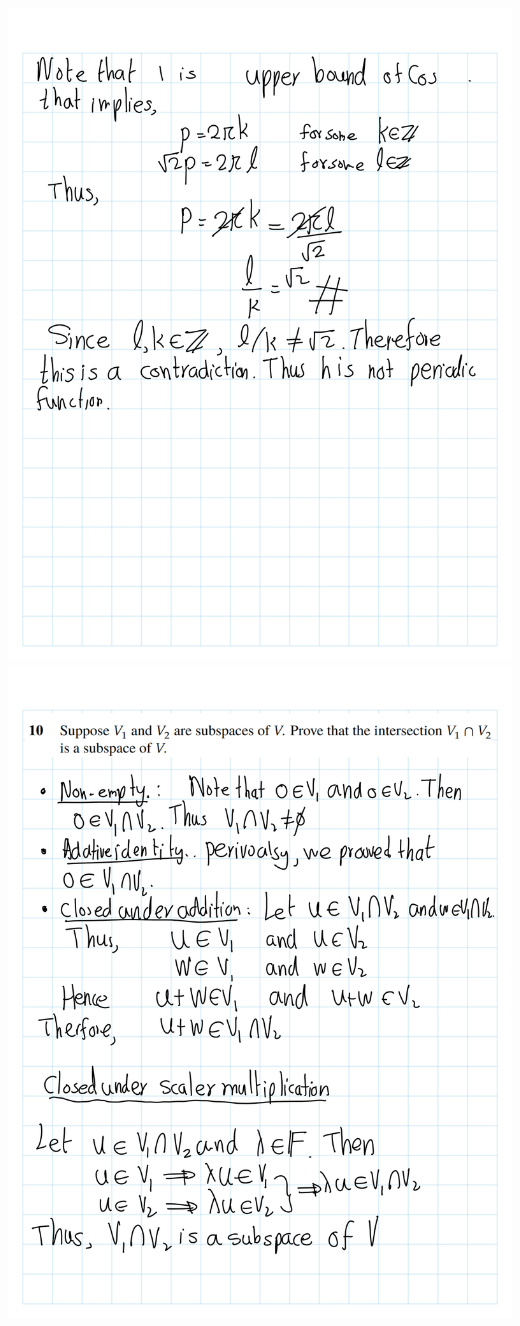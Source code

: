 \documentclass[
]{book}
\theoremstyle{definition}
\theoremstyle{definition}
\theoremstyle{definition}
\theoremstyle{definition}
\theoremstyle{remark}
\begin{document}
\begin{enumerate}
  \includegraphics{fig/Ex1C/Ex/Ex-08.png}
  \includegraphics{fig/Ex1C/Ex/Ex-09.png}

\end{enumerate}
\end{document}
